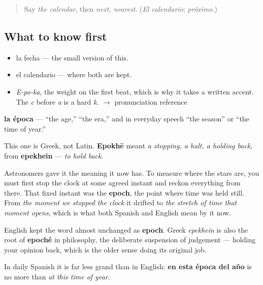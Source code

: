 \label{lesson:ES-C343-epoca}



\begin{quote}
Say \emph{the calendar}, then \emph{next, nearest}. (\emph{El calendario}; \emph{próximo}.)
\end{quote}

\subsection*{What to know first}
\begin{itemize}
\raggedright
  \item la fecha — the small version of this.
  \item el calendario — where both are kept.
\end{itemize}

\begin{sounds}
\begin{itemize}
\raggedright
  \item \emph{E-po-ka}, the weight on the first beat, which is why it takes a written accent. The \emph{c} before \emph{a} is a hard \emph{k}. $\to$ pronunciation reference
\end{itemize}
\end{sounds}

\begin{cousinweb}
\textbf{la época} — \textquotedblleft{}the age,\textquotedblright{} \textquotedblleft{}the era,\textquotedblright{} and in everyday speech \textquotedblleft{}the season\textquotedblright{} or \textquotedblleft{}the time of year.\textquotedblright{}

This one is Greek, not Latin. \textbf{Epokhē} meant \emph{a stopping, a halt, a holding back}, from \textbf{epekhein} — \emph{to hold back}.

Astronomers gave it the meaning it now has. To measure where the stars are, you must first stop the clock at some agreed instant and reckon everything from there. That fixed instant was the \textbf{epoch}, the point where time was held still. From \emph{the moment we stopped the clock} it drifted to \emph{the stretch of time that moment opens}, which is what both Spanish and English mean by it now.

English kept the word almost unchanged as \textbf{epoch}. Greek \emph{epekhein} is also the root of \textbf{epoché} in philosophy, the deliberate suspension of judgement — holding your opinion back, which is the older sense doing its original job.

In daily Spanish it is far less grand than in English: \textbf{en esta época del año} is no more than \emph{at this time of year}.
\end{cousinweb}

